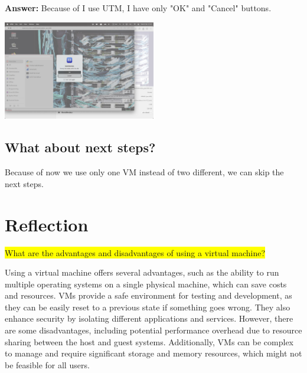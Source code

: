 \documentclass{article}
\begin{document}
\vspace{1\baselineskip}

\textbf{Answer: } Because of I use UTM, I have only "OK" and "Cancel" buttons.

\vspace{1\baselineskip}

\includegraphics[width=0.5\textwidth]{Part2/Step4/2.png}

\subsection*{What about next steps?}
Because of now we use only one VM instead of two different, we can skip the next steps.

\section*{Reflection}
\colorbox{yellow}{What are the advantages and disadvantages of using a virtual machine?}

\vspace{1\baselineskip}

Using a virtual machine offers several advantages, such as the ability to run multiple operating systems on a single physical machine, which can save costs and resources. VMs provide a safe environment for testing and development, as they can be easily reset to a previous state if something goes wrong. They also enhance security by isolating different applications and services. However, there are some disadvantages, including potential performance overhead due to resource sharing between the host and guest systems. Additionally, VMs can be complex to manage and require significant storage and memory resources, which might not be feasible for all users.
\end{document}
